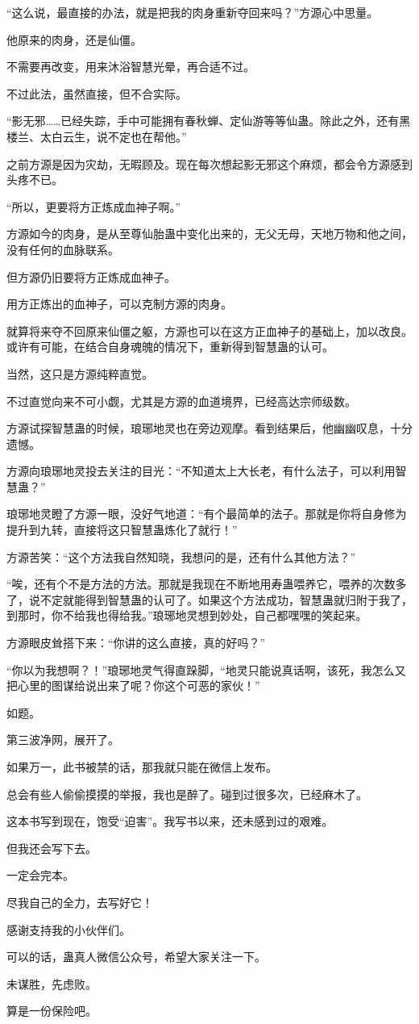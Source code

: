 \begin{this_body}
“这么说，最直接的办法，就是把我的肉身重新夺回来吗？”方源心中思量。

他原来的肉身，还是仙僵。

不需要再改变，用来沐浴智慧光晕，再合适不过。

不过此法，虽然直接，但不合实际。

“影无邪……已经失踪，手中可能拥有春秋蝉、定仙游等等仙蛊。除此之外，还有黑楼兰、太白云生，说不定也在帮他。”

之前方源是因为灾劫，无暇顾及。现在每次想起影无邪这个麻烦，都会令方源感到头疼不已。

“所以，更要将方正炼成血神子啊。”

方源如今的肉身，是从至尊仙胎蛊中变化出来的，无父无母，天地万物和他之间，没有任何的血脉联系。

但方源仍旧要将方正炼成血神子。

用方正炼出的血神子，可以克制方源的肉身。

就算将来夺不回原来仙僵之躯，方源也可以在这方正血神子的基础上，加以改良。或许有可能，在结合自身魂魄的情况下，重新得到智慧蛊的认可。

当然，这只是方源纯粹直觉。

不过直觉向来不可小觑，尤其是方源的血道境界，已经高达宗师级数。

方源试探智慧蛊的时候，琅琊地灵也在旁边观摩。看到结果后，他幽幽叹息，十分遗憾。

方源向琅琊地灵投去关注的目光：“不知道太上大长老，有什么法子，可以利用智慧蛊？”

琅琊地灵瞪了方源一眼，没好气地道：“有个最简单的法子。那就是你将自身修为提升到九转，直接将这只智慧蛊炼化了就行！”

方源苦笑：“这个方法我自然知晓，我想问的是，还有什么其他方法？”

“唉，还有个不是方法的方法。那就是我现在不断地用寿蛊喂养它，喂养的次数多了，说不定就能得到智慧蛊的认可了。如果这个方法成功，智慧蛊就归附于我了，到那时，你不给我也得给我。”琅琊地灵想到妙处，自己都嘿嘿的笑起来。

方源眼皮耸搭下来：“你讲的这么直接，真的好吗？”

“你以为我想啊？！”琅琊地灵气得直跺脚，“地灵只能说真话啊，该死，我怎么又把心里的图谋给说出来了呢？你这个可恶的家伙！”

\end{this_body}
\begin{this_body}
如题。

第三波净网，展开了。

如果万一，此书被禁的话，那我就只能在微信上发布。

总会有些人偷偷摸摸的举报，我也是醉了。碰到过很多次，已经麻木了。

这本书写到现在，饱受“迫害”。我写书以来，还未感到过的艰难。

但我还会写下去。

一定会完本。

尽我自己的全力，去写好它！

感谢支持我的小伙伴们。

可以的话，蛊真人微信公众号，希望大家关注一下。

未谋胜，先虑败。

算是一份保险吧。

\end{this_body}

